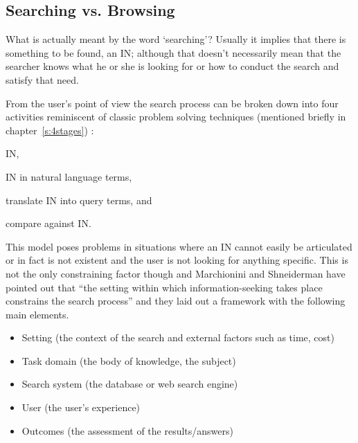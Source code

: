 \subsection{Searching vs. Browsing}
\label{s:browsing}

What is actually meant by the word `searching'? Usually it implies that there is something to be found, an \ac{IN}; although that doesn't necessarily mean that the searcher knows what he or she is looking for or how to conduct the search and satisfy that need.

From the user's point of view the search process can be broken down into four activities \autocite{Sutcliffe1998} reminiscent of classic problem solving techniques (mentioned briefly in chapter~\ref{s:4stages}) \autocite{Polya1957}:

\begin{description}[leftmargin=5cm]
  \item [Problem identification] \acf{IN},
  \item [Need articulation] \ac{IN} in natural language terms,
  \item [Query formulation] translate \ac{IN} into query terms, and
  \item [Results evaluation] compare against \ac{IN}.
\end{description}

This model poses problems in situations where an \ac{IN} cannot easily be articulated or in fact is not existent and the user is not looking for anything specific. This is not the only constraining factor though and Marchionini and Shneiderman have pointed out that ``the setting within which information-seeking takes place constrains the search process'' \autocite*{Marchionini1988} and they laid out a framework with the following main elements.

\begin{itemize}
  \item Setting (the context of the search and external factors such as time, cost)
  \item Task domain (the body of knowledge, the subject)
  \item Search system (the database or web search engine)
  \item User (the user’s experience)
  \item Outcomes (the assessment of the results/answers)
\end{itemize}

\spirals


